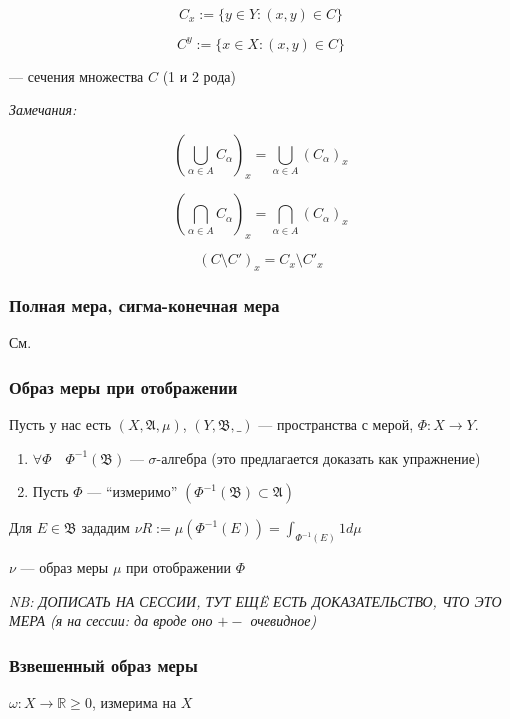 \documentclass{article}
\begin{document}
\[C_{x} := \{y \in Y: (x, y) \in C\}\]

\[C^{y} := \{x \in X: (x, y) \in C\}\]

--- сечения множества $C$ (1 и 2 рода)

\textit{Замечания: }

\[\left(\bigcup_{\alpha \in A} C_{\alpha}\right)_{x} = \bigcup_{\alpha \in A} \left(C_{\alpha}\right)_{x}\]

\[\left(\bigcap_{\alpha \in A} C_{\alpha}\right)_{x} = \bigcap_{\alpha \in A} \left(C_{\alpha}\right)_{x}\]

\[\left(C \setminus C'\right)_{x} = C_{x} \setminus C'_{x}\]

\subsubsection{Полная мера, сигма-конечная мера}

См. \href{http://gg.gg/holykpksem3}{\color{blue}{конспект прошлого семестра}}

\subsubsection{Образ меры при отображении}

Пусть у нас есть $(X, \mathfrak{A}, \mu)$, $(Y, \mathfrak{B}, \_ )$ --- пространства с мерой, $\Phi: X \rightarrow Y$.

\begin{enumerate}
    \item $\forall \Phi \quad \Phi^{-1}(\mathfrak{B})$ --- $\sigma$-алгебра (это предлагается доказать как упражнение)
    \item Пусть $\Phi$ --- ``измеримо'' $\left(\Phi^{-1}(\mathfrak{B}) \subset \mathfrak{A}\right)$
\end{enumerate}

Для $E \in \mathfrak{B}$ зададим $\nu R := \mu\left(\Phi^{-1}(E)\right) = \int_{\Phi^{-1}(E)} 1 d \mu$

$\nu$ --- образ меры $\mu$ при отображении $\Phi$

\textit{NB: ДОПИСАТЬ НА СЕССИИ, ТУТ ЕЩË ЕСТЬ ДОКАЗАТЕЛЬСТВО, ЧТО ЭТО МЕРА (я на сессии: да вроде оно $+-$ очевидное)}

\subsubsection{Взвешенный образ меры}

$\omega: X \rightarrow \mathbb{R} \ge 0$, измерима на $X$
\end{document}
